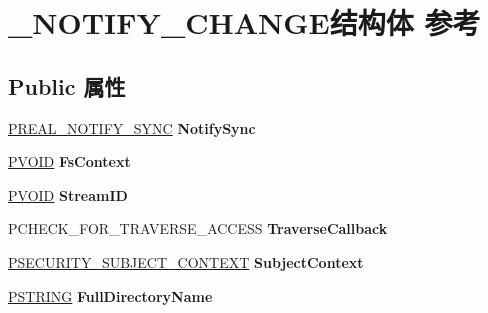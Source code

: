 \hypertarget{struct___n_o_t_i_f_y___c_h_a_n_g_e}{}\section{\+\_\+\+N\+O\+T\+I\+F\+Y\+\_\+\+C\+H\+A\+N\+G\+E结构体 参考}
\label{struct___n_o_t_i_f_y___c_h_a_n_g_e}
\subsection*{Public 属性}
\begin{DoxyCompactItemize}
\item 
\mbox{\label{struct___n_o_t_i_f_y___c_h_a_n_g_e_abd2c4e40113a27fa8d8c944f49739b96}} 
\hyperlink{struct___r_e_a_l___n_o_t_i_f_y___s_y_n_c}{P\+R\+E\+A\+L\+\_\+\+N\+O\+T\+I\+F\+Y\+\_\+\+S\+Y\+NC} {\bfseries Notify\+Sync}
\item 
\mbox{\label{struct___n_o_t_i_f_y___c_h_a_n_g_e_a38a065f74afac0b91e4409daf3f37b7c}} 
\hyperlink{interfacevoid}{P\+V\+O\+ID} {\bfseries Fs\+Context}
\item 
\mbox{\label{struct___n_o_t_i_f_y___c_h_a_n_g_e_ac3ea7f7c36e96b4ad0f0b8f08963567c}} 
\hyperlink{interfacevoid}{P\+V\+O\+ID} {\bfseries Stream\+ID}
\item 
\mbox{\label{struct___n_o_t_i_f_y___c_h_a_n_g_e_afa9ae7fc3cd8a6b139de0dbb02a07e96}} 
P\+C\+H\+E\+C\+K\+\_\+\+F\+O\+R\+\_\+\+T\+R\+A\+V\+E\+R\+S\+E\+\_\+\+A\+C\+C\+E\+SS {\bfseries Traverse\+Callback}
\item 
\mbox{\label{struct___n_o_t_i_f_y___c_h_a_n_g_e_a68a741e38a252e107316ded934a1b768}} 
\hyperlink{struct___s_e_c_u_r_i_t_y___s_u_b_j_e_c_t___c_o_n_t_e_x_t}{P\+S\+E\+C\+U\+R\+I\+T\+Y\+\_\+\+S\+U\+B\+J\+E\+C\+T\+\_\+\+C\+O\+N\+T\+E\+XT} {\bfseries Subject\+Context}
\item 
\mbox{\label{struct___n_o_t_i_f_y___c_h_a_n_g_e_a0fc4a20f2b39563f1a0613cdfdd91e72}} 
\hyperlink{struct___s_t_r_i_n_g}{P\+S\+T\+R\+I\+NG} {\bfseries Full\+Directory\+Name}
\item 

\end{DoxyCompactItemize}

